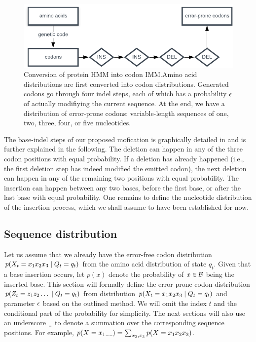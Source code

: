 \begin{figure}[htbp]
  \centering
  \captionsetup{width=.5\linewidth}
  \includegraphics[width=.5\linewidth]{figure/hmm-to-imm}
  \caption{Conversion of protein HMM into codon IMM.\@ Amino acid distributions are first converted
  into codon distributions. Generated codons go through four indel steps, each of which has a
  probability $\epsilon$ of actually modifiying the current sequence. At the end, we have a distribution
  of error-prone codons: variable-length sequences of one, two, three, four, or five
  nucleotides.}\label{fig:hmm-to-imm}
\end{figure}

The base-indel steps of our proposed mofication is graphically detailed in 
and is further explained in the following. The deletion can happen in any of the three codon
positions with equal probability. If a deletion has already happened (i.e., the first deletion step
has indeed modified the emitted codon), the next deletion can happen in any of the remaining two
positions with equal probability. The insertion can happen between any two bases, before the first
base, or after the last base with equal probability. One remains to define the nucleotide
distribution of the insertion process, which we shall assume to have been established for now.

\subsection{Sequence distribution}

Let us assume that we already have the error-free codon distribution $p(X_t=x_1x_2x_3 \;|\; Q_t=q_t)$
from the amino acid distribution of state $q_t$. Given that a base insertion occurs, let $p(x)$
denote the probability of $x \in \mathcal{B}$ being the inserted base. This section will formally define
the error-prone codon distribution $p(Z_t=z_1z_2\dots \;|\; Q_t=q_t)$ from distribution
$p(X_t=x_1x_2x_3 \;|\; Q_t = q_t)$ and parameter $\epsilon$ based on the outlined method. We will omit the
index $t$ and the conditional part of the probability for simplicity. The next sections will also
use an underscore $\s$ to denote a summation over the corresponding sequence positions. For example,
$p(X=x_1\s\s)=\sum_{x_2,x_3}p(X=x_1x_2x_3)$.

